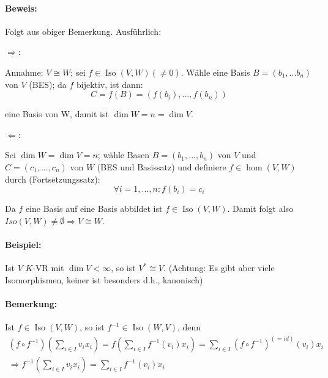 \paragraph{Beweis: }
	Folgt aus obiger Bemerkung. Ausführlich:
		
	$\Rightarrow$:
	
	Annahme: $V \cong W$; sei $f\in \operatorname{Iso}(V,W)(\neq 0)$.
	Wähle eine Basis $B = (b_1, ... b_n)$ von $V$ (BES); da $f$ bijektiv, ist dann:
	\begin{equation*}
		C = f(B) = (f(b_i), ... , f(b_n))
	\end{equation*}
	
	eine Basis von W, damit ist $\dim W = n = \dim V$.
	
	$\Leftarrow$:
	
	Sei $\dim W = \dim V = n$;
	wähle Basen $B = (b_1, ... ,b_n)$ von $V$ und $C = (c_1, ... ,c_n)$ von $W$ (BES und Basissatz) und definiere $f\in \hom(V,W)$ durch (Fortsetzungssatz):
	\begin{equation*}
		\forall i = 1, ... ,n : f(b_i) = c_i
	\end{equation*}

	Da $f$ eine Basis auf eine Basis abbildet ist $f\in \operatorname{Iso}(V,W)$.
	Damit folgt also $Iso(V,W) \neq \emptyset \Rightarrow V \cong W$.
			
\paragraph{Beispiel: }
	Ist $V$ $K$-VR mit $\dim V < \infty$, so ist $V^\ast \cong V$. (Achtung: Es gibt aber viele Isomorphismen, keiner ist besonders d.h., \glqq kanonisch\grqq )
	
\paragraph{Bemerkung: }
	Ist $f\in \operatorname{Iso}(V,W)$, so ist $f^{-1}\in \operatorname{Iso}(W,V)$, denn
	\begin{gather*}
		(f\circ f^{-1})(\sum_{i\in I}v_ix_i) = f(\sum_{i\in I}f^{-1}(v_i)x_i) = \sum_{i\in I}(f\circ f^{-1})^{(= id)}(v_i)x_i\\
		\Rightarrow f^{-1}(\sum_{i\in I}v_ix_i) = \sum_{i\in I}f^{-1}(v_i)x_i
	\end{gather*}

